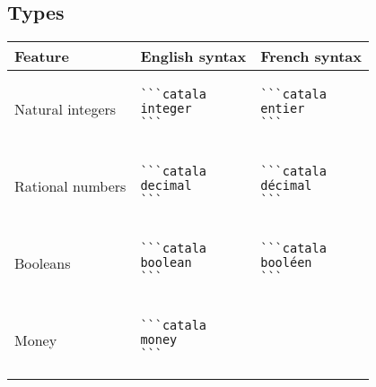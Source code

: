 \documentclass[a3paper,landscape]{article}
\begin{document}
\begin{multicols*}{2}
  \section*{Types}
  \begin{center}
    \begin{tabular}{p{}p{}p{}}
      \toprule
      Feature          & English syntax & French syntax \\\midrule
      Natural integers &
      \vspace*{-1.75em}
      \begin{verbatim}
```catala
integer
```
\end{verbatim}
      \vspace*{-1.75em}
                       &
      \vspace*{-1.75em}
      \begin{verbatim}
```catala
entier
```
\end{verbatim}
      \vspace*{-1.75em}
      \\
      Rational numbers &
      \vspace*{-1.75em}
      \begin{verbatim}
```catala
decimal
```
\end{verbatim}
      \vspace*{-1.75em}
                       &
      \vspace*{-1.75em}
      \begin{verbatim}
```catala
décimal
```
\end{verbatim}
      \vspace*{-1.75em}
      \\
      Booleans         &
      \vspace*{-1.75em}
      \begin{verbatim}
```catala
boolean
```
\end{verbatim}
      \vspace*{-1.75em}
                       &
      \vspace*{-1.75em}
      \begin{verbatim}
```catala
booléen
```
\end{verbatim}
      \vspace*{-1.75em}
      \\
      Money            &
      \vspace*{-1.75em}
      \begin{verbatim}
```catala
money
```

\end{verbatim}
\end{tabular}
\end{center}
\end{multicols*}
\end{document}
